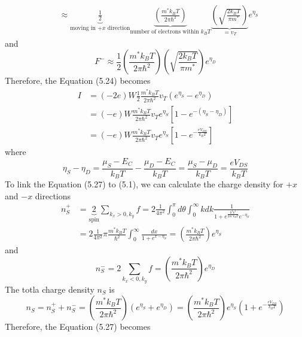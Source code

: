 \begin{align}
    & \approx \underbrace{\frac{1}{2}}_{\text{moving in $+x$ direction}}\underbrace{\left(\frac{m^{*}k_{B}T}{2\pi\hbar^{2}}\right)}_{\text{number of electrons within $k_{B}T$}}\underbrace{\left(\sqrt{\frac{2k_{B}T}{\pi m^{*}}}\right)}_{=v_{T}}e^{\eta_{S}}
\end{align} and \begin{equation}
    F^{-} \approx \frac{1}{2}\left(\frac{m^{*}k_{B}T}{2\pi\hbar^{2}}\right)\left(\sqrt{\frac{2k_{B}T}{\pi m^{*}}}\right)e^{\eta_{D}}
\end{equation} Therefore, the Equation (5.24) becomes \begin{align}
    I& = (-2e)W\frac{1}{2}\frac{m^{*}k_{B}T}{2\pi\hbar^{2}}v_{T}(e^{\eta_{S}}-e^{\eta_{D}})\nonumber\\
    & = (-e)W\frac{m^{*}k_{B}T}{2\pi\hbar^{2}}v_{T}e^{\eta_{S}}\left[1-e^{-(\eta_{S}-\eta_{D})}\right]\nonumber\\
    & = (-e)W\frac{m^{*}k_{B}T}{2\pi\hbar^{2}}v_{T}e^{\eta_{S}}\left[1-e^{-\frac{eV_{DS}}{k_{B}T}}\right]
\end{align} where \begin{equation}
    \eta_{S}-\eta_{D} = \frac{\mu_{S}-E_{C}}{k_{B}T}-\frac{\mu_{D}-E_{C}}{k_{B}T} = \frac{\mu_{S}-\mu_{D}}{k_{B}T} = \frac{eV_{DS}}{k_{B}T}
\end{equation} To link the Equation (5.27) to (5.1), we can calculate the charge density for $+x$ and $-x$ directions \begin{align}
    n_{S}^{+}& = \underbrace{2}_{\text{spin}}\sum_{k_{x}>0,k_{y}}{f} = 2\frac{1}{4\pi^{2}}\int_{0}^{\pi}d\theta\int_{0}^{\infty}kdk\frac{1}{1+e^{\frac{\hbar^{2}k^{2}}{2m^{*}k_{B}T}}e^{-\eta_{S}}}\nonumber\\
    & = 2\frac{1}{4\pi^{2}}\pi\frac{m^{*}k_{B}T}{\hbar^{2}}\int_{0}^{\infty}\frac{dx}{1+e^{x-\eta_{S}}} = \left(\frac{m^{*}k_{B}T}{2\pi\hbar^{2}}\right)e^{\eta_{S}}
\end{align} and \begin{equation}
    n_{S}^{-} = 2\sum_{k_{x}<0,k_{y}}{f} = \left(\frac{m^{*}k_{B}T}{2\pi\hbar^{2}}\right)e^{\eta_{D}}
\end{equation} The totla charge density $n_{S}$ is \begin{equation}
    n_{S} = n_{S}^{+} + n_{S}^{-} = \left(\frac{m^{*}k_{B}T}{2\pi\hbar^{2}}\right)\left(e^{\eta_{S}}+e^{\eta_{D}}\right) = \left(\frac{m^{*}k_{B}T}{2\pi\hbar^{2}}\right)e^{\eta_{S}}\left(1+e^{-\frac{eV_{DS}}{k_{B}T}}\right)
\end{equation} Therefore, the Equation (5.27) becomes \begin{align}

\end{align}
